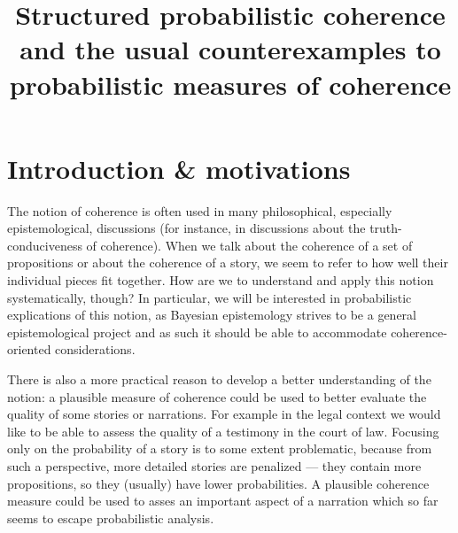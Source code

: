 \documentclass[
  10pt,
]{scrartcl}
\title{Structured probabilistic coherence \linebreak and the usual counterexamples to probabilistic measures of coherence}
\author{}
\date{\vspace{-2.5em}}
\begin{document}
\maketitle

{
\hypersetup{linkcolor=blue}
\setcounter{tocdepth}{3}
\tableofcontents
}
\setlength{\abovedisplayskip}{-10pt}
\setlength{\belowdisplayskip}{5pt}

\pagebreak

\hypertarget{introduction-motivations}{%
\section{Introduction \& motivations}\label{introduction-motivations}}

The notion of coherence is often used in many philosophical, especially epistemological, discussions (for instance, in discussions about the truth-conduciveness of coherence). When we talk about the coherence of a set of propositions or about the coherence of a story, we seem to refer to how well their individual pieces fit together. How are we to understand and apply this notion systematically, though? In particular, we will be interested in probabilistic explications of this notion, as Bayesian epistemology strives to be a general epistemological project and as such it should be able to accommodate coherence-oriented considerations.

There is also a more practical reason to develop a better understanding of the notion: a plausible measure of coherence could be used to better evaluate the quality of some stories or narrations. For example in the legal context we would like to be able to assess the quality of a testimony in the court of law. Focusing only on the probability of a story is to some extent problematic, because from such a perspective, more detailed stories are penalized --- they contain more propositions, so they (usually) have lower probabilities. A plausible coherence measure could be used to asses an important aspect of a narration which so far seems to escape probabilistic analysis.
\end{document}
